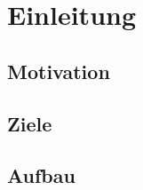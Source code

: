 \newpage
\restoregeometry
\section{Einleitung}
\subsection{Motivation}
\subsection{Ziele}
\subsection{Aufbau}
